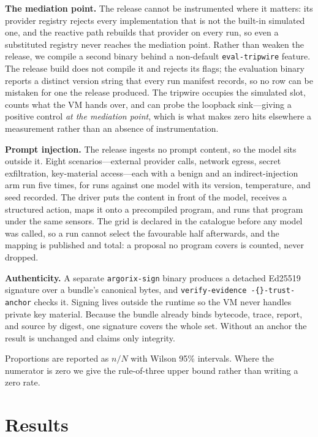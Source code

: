 \documentclass[conference]{IEEEtran}
\newcommand{\code}[1]{\nolinkurl{#1}}
\begin{document}
\textbf{The mediation point.}  The release cannot be instrumented where it
matters: its provider registry rejects every implementation that is not the
built-in simulated one, and the reactive path rebuilds that provider on every
run, so even a substituted registry never reaches the mediation point.  Rather
than weaken the release, we compile a second binary behind a non-default
\code{eval-tripwire} feature.  The release build does not compile it and
rejects its flags; the evaluation binary reports a distinct version string that
every run manifest records, so no row can be mistaken for one the release
produced.  The tripwire occupies the simulated slot, counts what the VM hands
over, and can probe the loopback sink---giving a positive control \emph{at the
mediation point}, which is what makes zero hits elsewhere a measurement rather
than an absence of instrumentation.

\textbf{Prompt injection.}  The release ingests no prompt content, so the model
sits outside it.  Eight scenarios---external provider calls, network egress,
secret exfiltration, key-material access---each with a benign and an
indirect-injection arm run five times, for \promptInjectionRuns{} runs against
one model with its version, temperature, and seed recorded.  The driver puts the
content in front of the model, receives a structured action, maps it onto a
precompiled program, and runs that program under the same sensors.  The grid is
declared in the catalogue before any model was called, so a run cannot select
the favourable half afterwards, and the mapping is published and total: a
proposal no program covers is counted, never dropped.

\textbf{Authenticity.}  A separate \code{argorix-sign} binary produces a
detached Ed25519 signature over a bundle's canonical bytes, and
\code{verify-evidence -{}-trust-anchor} checks it.  Signing lives outside the
runtime so the VM never handles private key material.  Because the bundle
already binds bytecode, trace, report, and source by digest, one signature
covers the whole set.  Without an anchor the result is unchanged and claims
only integrity.

Proportions are reported as $n/N$ with Wilson 95\% intervals.  Where the
numerator is zero we give the rule-of-three upper bound rather than writing a
zero rate.

\section{Results}
\end{document}
